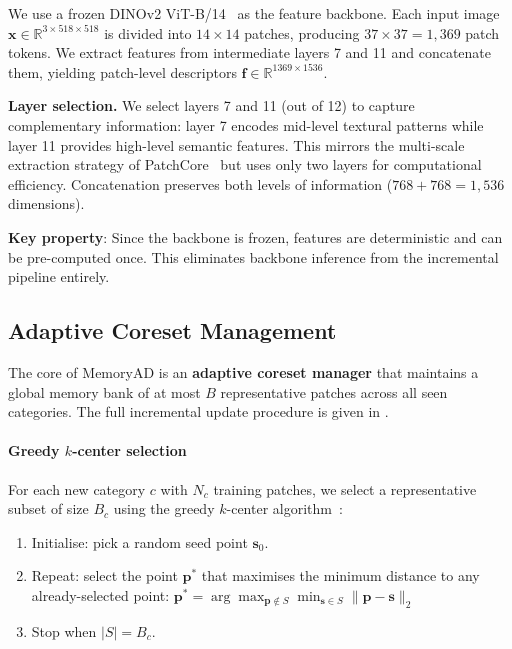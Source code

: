 \documentclass[conference]{IEEEtran}
\newcommand{\method}{MemoryAD}
\begin{document}
We use a frozen DINOv2 ViT-B/14~\cite{oquab2023dinov2} as the feature backbone. Each input image $\mathbf{x} \in \mathbb{R}^{3 \times 518 \times 518}$ is divided into $14 \times 14$ patches, producing $37 \times 37 = 1{,}369$ patch tokens. We extract features from intermediate layers 7 and 11 and concatenate them, yielding patch-level descriptors $\mathbf{f} \in \mathbb{R}^{1369 \times 1536}$.

\textbf{Layer selection.} We select layers 7 and 11 (out of 12) to capture complementary information: layer 7 encodes mid-level textural patterns while layer 11 provides high-level semantic features. This mirrors the multi-scale extraction strategy of PatchCore~\cite{roth2022patchcore} but uses only two layers for computational efficiency. Concatenation preserves both levels of information ($768 + 768 = 1{,}536$ dimensions).

\textbf{Key property}: Since the backbone is frozen, features are deterministic and can be pre-computed once. This eliminates backbone inference from the incremental pipeline entirely.

\subsection{Adaptive Coreset Management}
\label{sec:coreset}

The core of \method{} is an \textbf{adaptive coreset manager} that maintains a global memory bank of at most $B$ representative patches across all seen categories. The full incremental update procedure is given in .

\paragraph{Greedy $k$-center selection}
For each new category $c$ with $N_c$ training patches, we select a representative subset of size $B_c$ using the greedy $k$-center algorithm~\cite{agarwal2005geometric}:
\begin{enumerate}
    \item Initialise: pick a random seed point $\mathbf{s}_0$.
    \item Repeat: select the point $\mathbf{p}^*$ that maximises the minimum distance to any already-selected point:
    $\mathbf{p}^* = \arg\max_{\mathbf{p} \notin S} \min_{\mathbf{s} \in S} \|\mathbf{p} - \mathbf{s}\|_2$
    \item Stop when $|S| = B_c$.
\end{enumerate}
\end{document}
